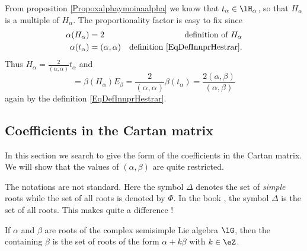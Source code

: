 From proposition \ref{Propoxalphaymoinaalpha} we know that \( t_{\alpha}\in\lH_{\alpha}\), so that \( H_{\alpha}\) is a multiple of \( H_{\alpha}\). The proportionality factor is easy to fix since
\begin{equation}        \label{EqRealsHalpatalphaNorsmd}
    \begin{aligned}[]
        \alpha(H_{\alpha})&=2 &\text{definition of $H_{\alpha}$}\\
        \alpha(t_{\alpha})&=(\alpha,\alpha) &\text{definition \eqref{EqDefInnprHestrar}}.
    \end{aligned}
\end{equation}
Thus \( H_{\alpha}=\frac{ 2 }{ (\alpha,\alpha) }t_{\alpha}\) and 
\begin{equation}
    [H_{\alpha},E_{\beta}]=\beta(H_{\alpha})E_{\beta}=\frac{ 2 }{ (\alpha,\alpha) }\beta(t_{\alpha})=\frac{ 2(\alpha,\beta) }{ (\alpha,\beta) }
\end{equation}
again by the definition \eqref{EqDefInnprHestrar}.

\subsection{Coefficients in the Cartan matrix}

In this section we search to give the form of the coefficients in the Cartan matrix. We will show that the values of \( (\alpha,\beta)\) are quite restricted.

\begin{remark}
    The notations are not standard. Here the symbol \( \Delta\) denotes the set of \emph{simple} roots while the set of all roots is denoted by \( \Phi\). In the book \cite{Cornwell}, the symbol \( \Delta\) is the set of all roots. This makes quite a difference !
\end{remark}

\begin{definition}
    If \( \alpha\) and \( \beta\) are roots of the complex semisimple Lie algebra \( \lG\), then the  containing \( \beta\) is the set of roots of the form \( \alpha+k\beta\) with \( k\in\eZ\).
\end{definition}


